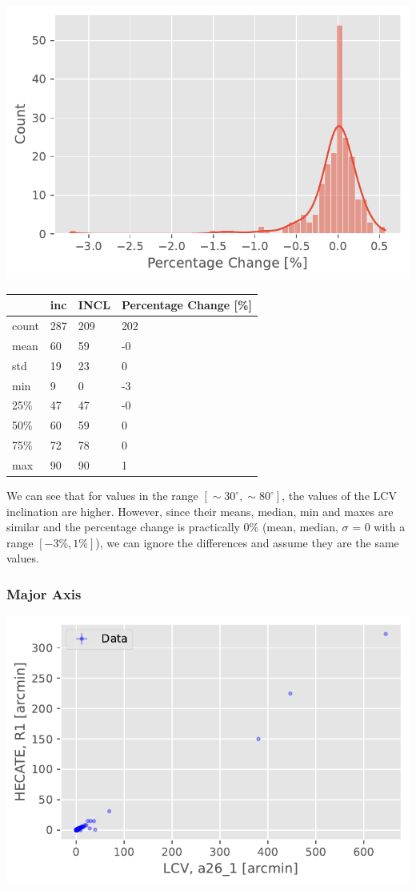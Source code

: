 \documentclass[
]{article}
\begin{document}
\includegraphics{compare_files/figure-pdf/cell-30-output-2.pdf}

\begin{longtable}[]{@{}llll@{}}
\toprule\noalign{}
& inc & INCL & Percentage Change {[}\%{]} \\
\midrule\noalign{}
\endhead
\bottomrule\noalign{}
\endlastfoot
count & 287 & 209 & 202 \\
mean & 60 & 59 & -0 \\
std & 19 & 23 & 0 \\
min & 9 & 0 & -3 \\
25\% & 47 & 47 & -0 \\
50\% & 60 & 59 & 0 \\
75\% & 72 & 78 & 0 \\
max & 90 & 90 & 1 \\
\end{longtable}

We can see that for values in the range
\([\sim 30^\circ,\sim 80^\circ]\), the values of the LCV inclination are
higher. However, since their means, median, min and maxes are similar
and the percentage change is practically 0\% (mean, median, \(\sigma\) =
0 with a range \([-3\%,1\%]\)), we can ignore the differences and assume
they are the same values.

\subsubsection{Major Axis}

\includegraphics{compare_files/figure-pdf/cell-31-output-1.pdf}
\end{document}
